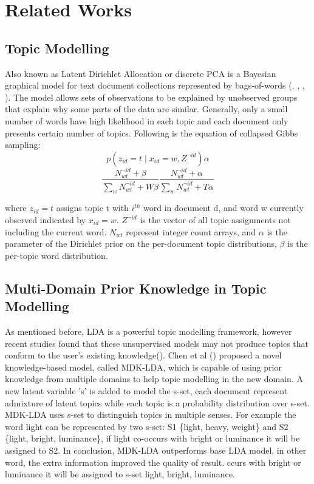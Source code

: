 \documentclass[11pt,twoside]{report}
\begin{document}
\chapter{Related Works}

\section{Topic Modelling}
Also known as Latent Dirichlet Allocation or discrete PCA is a Bayesian graphical model for text document collections represented by bags-of-words (\cite{ref26}, \cite{ref25}, \cite{ref30}, \cite{ref31}). The model allows sets of observations to be explained by unobserved groups that explain why some parts of the data are similar. Generally, only a small number of words have high likelihood in each topic and each document only presents certain number of topics. Following is the equation of collapsed Gibbs sampling:
\begin{equation}
p(z_{id}=t\mid x_{id}=w,Z^{\neg id}) \alpha
\end{equation}
\begin{equation}
\frac{N_{wt}^{\neg id} + \beta}{\sum_{w}N_{wt}^{\neg id} + W\beta} \frac{N_{wt}^{\neg id} + \alpha}{\sum_{w}N_{wt}^{\neg id} + T\alpha}
\end{equation}

where $z_{id}=t$ assigns topic t with $i^{th}$ word in document d, and word w currently observed indicated by $x_{id}=w$.
$Z^{\neg id}$ is the vector of all topic assignments not including the current word. $N_{wt}$ represent integer count arrays, and $\alpha$ is the parameter of the Dirichlet prior on the per-document topic distributions, $\beta$ is the per-topic word distribution.

\section{Multi-Domain Prior Knowledge in Topic Modelling}
As mentioned before, LDA is a powerful topic modelling framework, however recent studies found that these unsupervised models may not produce topics that conform to the user's existing knowledge(\cite{ref24}). Chen et al (\cite{ref24}) proposed a novel knowledge-based model, called MDK-LDA, which is capable of using prior knowledge from multiple domains to help topic modelling in the new domain. A new latent variable 's' is added to model the s-set, each document represent admixture of latent topics while each topic is a probability distribution over s-set. MDK-LDA uses s-set to distinguish topics in multiple senses. For example the word light can be represented by two s-set: S1 \{light, heavy, weight\} and S2 \{light, bright, luminance\}, if light co-occurs with bright or luminance it will be assigned to S2.
In conclusion, MDK-LDA outperforms base LDA model, in other word, the extra information improved the quality of result. 
ccurs with bright or luminance it will be assigned to s-set {light, bright, luminance}.
\end{document}
